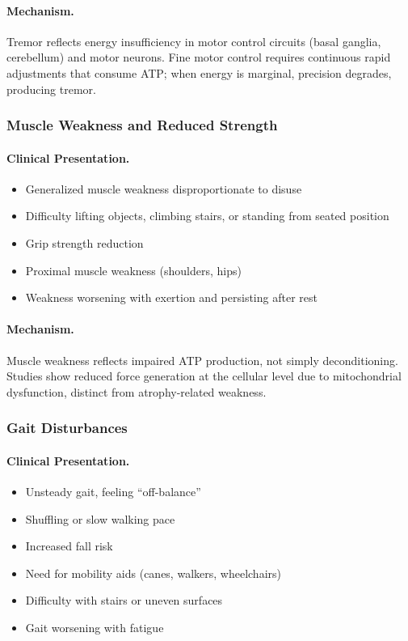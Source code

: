 \paragraph{Mechanism.}
Tremor reflects energy insufficiency in motor control circuits (basal ganglia, cerebellum) and motor neurons. Fine motor control requires continuous rapid adjustments that consume ATP; when energy is marginal, precision degrades, producing tremor.

\subsubsection{Muscle Weakness and Reduced Strength}

\paragraph{Clinical Presentation.}
\begin{itemize}
    \item Generalized muscle weakness disproportionate to disuse
    \item Difficulty lifting objects, climbing stairs, or standing from seated position
    \item Grip strength reduction
    \item Proximal muscle weakness (shoulders, hips)
    \item Weakness worsening with exertion and persisting after rest
\end{itemize}

\paragraph{Mechanism.}
Muscle weakness reflects impaired ATP production, not simply deconditioning. Studies show reduced force generation at the cellular level due to mitochondrial dysfunction, distinct from atrophy-related weakness.

\subsubsection{Gait Disturbances}

\paragraph{Clinical Presentation.}
\begin{itemize}
    \item Unsteady gait, feeling ``off-balance''
    \item Shuffling or slow walking pace
    \item Increased fall risk
    \item Need for mobility aids (canes, walkers, wheelchairs)
    \item Difficulty with stairs or uneven surfaces
    \item Gait worsening with fatigue
\end{itemize}


